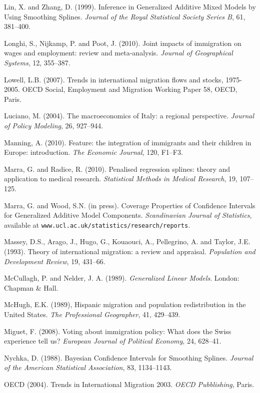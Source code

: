 \documentclass[12pt]{article}
\theoremstyle{definition}
\theoremstyle{plain}
\begin{document}
\begin{thebibliography}{99}
\bibitem{} Lin, X. and Zhang, D. (1999). Inference in Generalized Additive Mixed Models by Using Smoothing Splines. \textit{Journal of the Royal Statistical Society Series B}, 61, 381--400.

\bibitem{} Longhi, S.,  Nijkamp, P. and Poot, J. (2010). Joint impacts of immigration on wages and employment: review and meta-analysis. \textit{Journal of Geographical Systems}, 12, 355--387.

\bibitem{} Lowell, L.B. (2007). Trends in international migration flows and stocks, 1975-2005. OECD Social, Employment and Migration Working Paper 58, OECD, Paris.

\bibitem{} Luciano, M. (2004). The macroeconomics of Italy: a regional perspective. \textit{Journal of Policy Modeling}, 26, 927--944.

\bibitem{} Manning, A. (2010). Feature: the integration of immigrants and their children in Europe: introduction. \textit{The Economic Journal}, 120, F1--F3. 

\bibitem{} Marra, G. and Radice, R. (2010). Penalised regression splines: theory and application to medical research. \textit{Statistical Methods in Medical Research}, 19, 107--125.

\bibitem{} Marra, G. and Wood, S.N. (in press). Coverage Properties of Confidence Intervals for Generalized Additive Model Components. \textit{Scandinavian Journal of Statistics}, available at \texttt{www.ucl.ac.uk/statistics/research/reports}.

\bibitem{} Massey, D.S., Arago, J., Hugo, G., Kouaouci, A., Pellegrino, A. and Taylor, J.E. (1993). Theory of international migration: a review and appraisal. \textit{Population and Development Review}, 19, 431--66.

\bibitem{} McCullagh, P. and Nelder, J. A. (1989). \textit{Generalized Linear Models}. London: Chapman \& Hall.

\bibitem{} McHugh, E.K. (1989), Hispanic migration and population redistribution in the United States. \textit{The Professional Geographer}, 41, 429--439.

\bibitem{} Miguet, F. (2008). Voting about immigration policy: What does the Swiss experience tell us? \textit{European Journal of Political Economy}, 24, 628--41.

\bibitem{} Nychka, D. (1988). Bayesian Confidence Intervals for Smoothing Splines. \textit{Journal of the American Statistical Association}, 83, 1134--1143.

\bibitem{} OECD (2004). Trends in International Migration 2003. \textit{OECD Pubblishing}, Paris.


\end{thebibliography}
\end{document}
